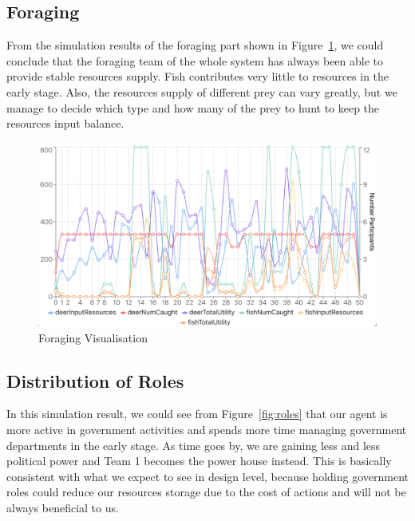 \subsection{Foraging} \label{subsec:Team6_Eval_Foraging}

From the simulation results of the foraging part shown in Figure~\ref{fig:foraging}, we could conclude that the foraging team of the whole system has always been able to provide stable resources supply. Fish contributes very little to resources in the early stage. Also, the resources supply of different prey can vary greatly, but we manage to decide which type and how many of the prey to hunt to keep the resources input balance.
\begin{figure}[htp]
    \centering
    \includegraphics[width=12cm]{14_team6_agentdesign/images/foraging.png}
    \caption{Foraging Visualisation}
    \label{fig:foraging}
\end{figure}

\subsection{Distribution of Roles} \label{subsec:Team6_Eval_Roles}

In this simulation result, we could see from Figure~\ref{fig:roles} that our agent is more active in government activities and spends more time managing government departments in the early stage. As time goes by, we are gaining less and less political power and Team 1 becomes the power house instead. This is basically consistent with what we expect to see in design level, because holding government roles could reduce our resources storage due to the cost of actions and will not be always beneficial to us. 

